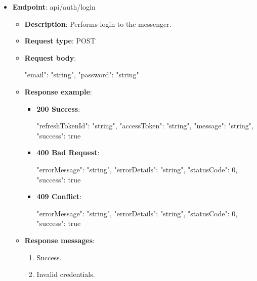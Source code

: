 \begin{itemize}
    \item \textbf{Endpoint}: api/auth/login
    \begin{itemize}
        \item \textbf{Description}: Performs login to the messenger.
        \item \textbf{Request type}: POST
        \item \textbf{Request body}:
        \begin{spverbatim}
        {
            "email": "string",
            "password": "string"
        }
        \end{spverbatim}
        \item \textbf{Response example}:
        \begin{itemize}
            \item \textbf{200 Success}:
            \begin{spverbatim}
            {
                "refreshTokenId": "string",
                "accessToken": "string",
                "message": "string",
                "success": true
            }
            \end{spverbatim}
            \item \textbf{400 Bad Request}:

            \begin{spverbatim}
            {
                "errorMessage": "string",
                "errorDetails": "string",
                "statusCode": 0,
                "success": true
            }
            \end{spverbatim}
            \item \textbf{409 Conflict}:
            \begin{spverbatim}
            {
                "errorMessage": "string",
                "errorDetails": "string",
                "statusCode": 0,
                "success": true
            }
            \end{spverbatim}
        \end{itemize}
        \item \textbf{Response messages}:
        \begin{enumerate}
            \item Success.
            \item Invalid credentials.
        \end{enumerate}
    \end{itemize}



\end{itemize}
